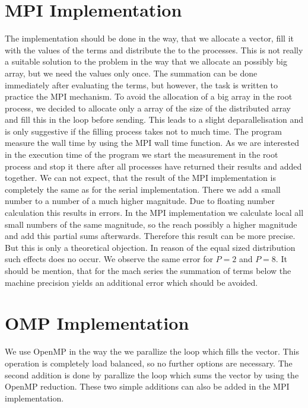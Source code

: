 \section{MPI Implementation}

The implementation should be done in the way, that we allocate a vector, fill it with the values of the terms and distribute the to the processes. This is not really a suitable solution to the problem in the way that we allocate an possibly big array, but we need the values only once. The summation can be done immediately after evaluating the terms, but however, the task is written to practice the MPI mechanism. To avoid the allocation of a big array in the root process, we decided to allocate only a array of the size of the distributed array and fill this in the loop before sending. This leads to a slight deparallelisation and is only suggestive if the filling process takes not to much time. The program measure the wall time by using the MPI wall time function. As we are interested in the execution time of the program we start the measurement in the root process and stop it there after all processes have returned their results and added together. We can not expect, that the result of the MPI implementation is completely the same as for the serial implementation. There we add a small number to a number of a much higher magnitude. Due to floating number calculation this results in errors. In the MPI implementation we calculate local all small numbers of the same magnitude, so the reach possibly a higher magnitude and add this partial sums afterwards. Therefore this result can be more precise. But this is only a theoretical objection. In reason of the equal sized distribution such effects does no occur. We observe the same error for $P=2$ and $P=8$. It should be mention, that for the mach series the summation of terms below the machine precision yields an additional error which should be avoided. 


\section{OMP Implementation}

We use OpenMP in the way the we parallize the loop which fills the vector. This operation is completely load balanced, so no further options are necessary. The second addition is done by parallize the loop which sums the vector by using the OpenMP reduction. These two simple additions can also be added in the MPI implementation. 

